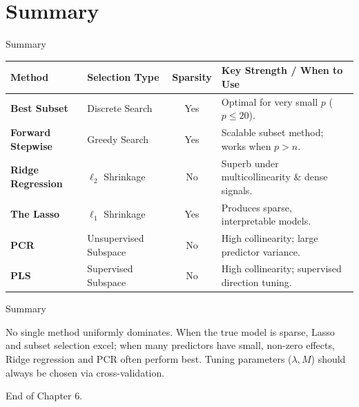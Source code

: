 \documentclass[aspectratio=169, 11pt]{beamer}
\begin{document}
\section{Summary}

\begin{frame}{Summary}
    \begin{table}
        \centering
        \footnotesize
        \begin{tabular}{l l c p{4.75cm}}
            \toprule
            \textbf{Method} & \textbf{Selection Type} & \textbf{Sparsity} & \textbf{Key Strength / When to Use} \\
            \midrule
            \textbf{Best Subset} & Discrete Search & Yes & Optimal for very small $p$ ($p \le 20$). \\
            \addlinespace[0.3em]
            \textbf{Forward Stepwise} & Greedy Search & Yes & Scalable subset method; works when $p > n$. \\
            \addlinespace[0.3em]
            \textbf{Ridge Regression} & $\ell_2$ Shrinkage & No & Superb under multicollinearity \& dense signals. \\
            \addlinespace[0.3em]
            \textbf{The Lasso} & $\ell_1$ Shrinkage & Yes & Produces sparse, interpretable models. \\
            \addlinespace[0.3em]
            \textbf{PCR} & Unsupervised Subspace & No & High collinearity; large predictor variance. \\
            \addlinespace[0.3em]
            \textbf{PLS} & Supervised Subspace & No & High collinearity; supervised direction tuning. \\
            \bottomrule
        \end{tabular}
    \end{table}
\end{frame}

\begin{frame}{Summary}
    \begin{tcolorbox}[colback=blue!5!white,colframe=blue!75!black,title=Core Conclusion]
        No single method uniformly dominates. When the true model is sparse, Lasso and subset selection excel; when many predictors have small, non-zero effects, Ridge regression and PCR often perform best. Tuning parameters ($\lambda, M$) should always be chosen via cross-validation.
    \end{tcolorbox}
\end{frame}

\begin{frame}{}
    \centering
    \Huge End of Chapter 6.
\end{frame}
\end{document}
